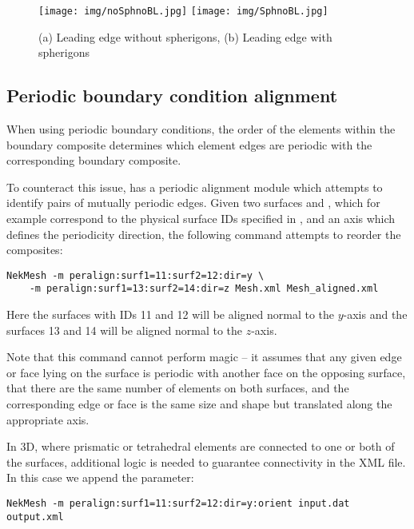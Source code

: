\begin{figure}[!htbp]
  \begin{center}
    \texttt{[image: img/noSphnoBL.jpg]}
    \texttt{[image: img/SphnoBL.jpg]}
    \caption{(a) Leading edge without spherigons, (b) Leading edge with
      spherigons}
  \end{center}
\end{figure}

\subsection{Periodic boundary condition alignment}

When using periodic boundary conditions, the order of the elements within the
boundary composite determines which element edges are periodic with the
corresponding boundary composite.

To counteract this issue, \mc has a periodic alignment module which attempts to
identify pairs of mutually periodic edges. Given two surfaces  and
, which for example correspond to the physical surface IDs
specified in \gmsh, and an axis which defines the periodicity direction, the
following command attempts to reorder the composites:
%
\begin{lstlisting}[style=BashInputStyle]
NekMesh -m peralign:surf1=11:surf2=12:dir=y \
    -m peralign:surf1=13:surf2=14:dir=z Mesh.xml Mesh_aligned.xml
\end{lstlisting}
%
Here the surfaces with IDs 11 and 12 will be aligned normal to the $y$-axis and
the surfaces 13 and 14 will be aligned normal to the $z$-axis.

Note that this command cannot perform magic -- it assumes that any given edge or
face lying on the surface is periodic with another face on the opposing surface,
that there are the same number of elements on both surfaces, and the
corresponding edge or face is the same size and shape but translated along the
appropriate axis.

In 3D, where prismatic or tetrahedral elements are connected to one or both of
the surfaces, additional logic is needed to guarantee connectivity in the XML
file. In this case we append the \inltt{orient} parameter:
%
\begin{lstlisting}[style=BashInputStyle]
NekMesh -m peralign:surf1=11:surf2=12:dir=y:orient input.dat output.xml
\end{lstlisting}

